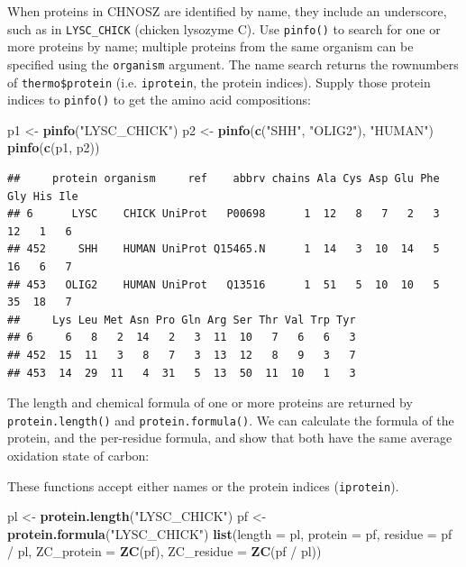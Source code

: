 \documentclass[]{tufte-handout}
\newenvironment{Shaded}{}{}
\newcommand{\KeywordTok}[1]{\textcolor[rgb]{0.00,0.44,0.13}{\textbf{#1}}}
\newcommand{\DataTypeTok}[1]{\textcolor[rgb]{0.56,0.13,0.00}{#1}}
\newcommand{\StringTok}[1]{\textcolor[rgb]{0.25,0.44,0.63}{#1}}
\newcommand{\OperatorTok}[1]{\textcolor[rgb]{0.40,0.40,0.40}{#1}}
\newcommand{\NormalTok}[1]{#1}
\begin{document}
When proteins in CHNOSZ are identified by name, they include an
underscore, such as in \texttt{LYSC\_CHICK} (chicken lysozyme C). Use
{\texttt{pinfo()}} to search for one or more proteins by name; multiple
proteins from the same organism can be specified using the
\texttt{organism} argument. The name search returns the rownumbers of
\texttt{thermo\$protein} (i.e. \texttt{iprotein}, the protein indices).
Supply those protein indices to {\texttt{pinfo()}} to get the amino acid
compositions:

\begin{Shaded}
\begin{Highlighting}[]
\NormalTok{p1 <-}\StringTok{ }\KeywordTok{pinfo}\NormalTok{(}\StringTok{"LYSC_CHICK"}\NormalTok{)}
\NormalTok{p2 <-}\StringTok{ }\KeywordTok{pinfo}\NormalTok{(}\KeywordTok{c}\NormalTok{(}\StringTok{"SHH"}\NormalTok{, }\StringTok{"OLIG2"}\NormalTok{), }\StringTok{"HUMAN"}\NormalTok{)}
\KeywordTok{pinfo}\NormalTok{(}\KeywordTok{c}\NormalTok{(p1, p2))}
\end{Highlighting}
\end{Shaded}

\begin{verbatim}
##     protein organism     ref    abbrv chains Ala Cys Asp Glu Phe Gly His Ile
## 6      LYSC    CHICK UniProt   P00698      1  12   8   7   2   3  12   1   6
## 452     SHH    HUMAN UniProt Q15465.N      1  14   3  10  14   5  16   6   7
## 453   OLIG2    HUMAN UniProt   Q13516      1  51   5  10  10   5  35  18   7
##     Lys Leu Met Asn Pro Gln Arg Ser Thr Val Trp Tyr
## 6     6   8   2  14   2   3  11  10   7   6   6   3
## 452  15  11   3   8   7   3  13  12   8   9   3   7
## 453  14  29  11   4  31   5  13  50  11  10   1   3
\end{verbatim}

The length and chemical formula of one or more proteins are returned by
{\texttt{protein.length()}} and {\texttt{protein.formula()}}. We can
calculate the formula of the protein, and the per-residue formula, and
show that both have the same average oxidation state of carbon:

\begin{marginfigure}
These functions accept either names or the protein indices
(\texttt{iprotein}).
\end{marginfigure}

\begin{Shaded}
\begin{Highlighting}[]
\NormalTok{pl <-}\StringTok{ }\KeywordTok{protein.length}\NormalTok{(}\StringTok{"LYSC_CHICK"}\NormalTok{)}
\NormalTok{pf <-}\StringTok{ }\KeywordTok{protein.formula}\NormalTok{(}\StringTok{"LYSC_CHICK"}\NormalTok{)}
\KeywordTok{list}\NormalTok{(}\DataTypeTok{length =}\NormalTok{ pl, }\DataTypeTok{protein =}\NormalTok{ pf, }\DataTypeTok{residue =}\NormalTok{ pf }\OperatorTok{/}\StringTok{ }\NormalTok{pl,}
     \DataTypeTok{ZC_protein =} \KeywordTok{ZC}\NormalTok{(pf), }\DataTypeTok{ZC_residue =} \KeywordTok{ZC}\NormalTok{(pf }\OperatorTok{/}\StringTok{ }\NormalTok{pl))}
\end{Highlighting}
\end{Shaded}
\end{document}

